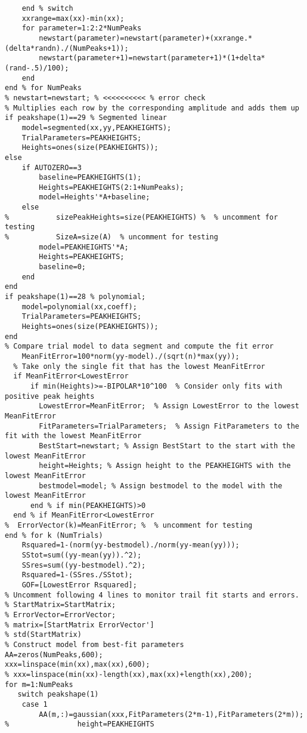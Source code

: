 \begin{lstlisting}
    end % switch
    xxrange=max(xx)-min(xx);
    for parameter=1:2:2*NumPeaks
        newstart(parameter)=newstart(parameter)+(xxrange.*(delta*randn)./(NumPeaks+1));
        newstart(parameter+1)=newstart(parameter+1)*(1+delta*(rand-.5)/100);
    end
end % for NumPeaks
% newstart=newstart; % <<<<<<<<<< % error check
% Multiplies each row by the corresponding amplitude and adds them up
if peakshape(1)==29 % Segmented linear
    model=segmented(xx,yy,PEAKHEIGHTS);
    TrialParameters=PEAKHEIGHTS;
    Heights=ones(size(PEAKHEIGHTS));
else
    if AUTOZERO==3
        baseline=PEAKHEIGHTS(1);
        Heights=PEAKHEIGHTS(2:1+NumPeaks);
        model=Heights'*A+baseline;
    else
%           sizePeakHeights=size(PEAKHEIGHTS) %  % uncomment for testing
%           SizeA=size(A)  % uncomment for testing
        model=PEAKHEIGHTS'*A;
        Heights=PEAKHEIGHTS;
        baseline=0;
    end
end
if peakshape(1)==28 % polynomial;
    model=polynomial(xx,coeff);
    TrialParameters=PEAKHEIGHTS;
    Heights=ones(size(PEAKHEIGHTS));
end
% Compare trial model to data segment and compute the fit error
    MeanFitError=100*norm(yy-model)./(sqrt(n)*max(yy));
  % Take only the single fit that has the lowest MeanFitError
  if MeanFitError<LowestError
      if min(Heights)>=-BIPOLAR*10^100  % Consider only fits with positive peak heights
        LowestError=MeanFitError;  % Assign LowestError to the lowest MeanFitError
        FitParameters=TrialParameters;  % Assign FitParameters to the fit with the lowest MeanFitError
        BestStart=newstart; % Assign BestStart to the start with the lowest MeanFitError
        height=Heights; % Assign height to the PEAKHEIGHTS with the lowest MeanFitError
        bestmodel=model; % Assign bestmodel to the model with the lowest MeanFitError
      end % if min(PEAKHEIGHTS)>0
  end % if MeanFitError<LowestError
%  ErrorVector(k)=MeanFitError; %  % uncomment for testing
end % for k (NumTrials)
    Rsquared=1-(norm(yy-bestmodel)./norm(yy-mean(yy)));
    SStot=sum((yy-mean(yy)).^2);
    SSres=sum((yy-bestmodel).^2);
    Rsquared=1-(SSres./SStot);
    GOF=[LowestError Rsquared];
% Uncomment following 4 lines to monitor trail fit starts and errors.
% StartMatrix=StartMatrix;
% ErrorVector=ErrorVector;
% matrix=[StartMatrix ErrorVector']
% std(StartMatrix)
% Construct model from best-fit parameters
AA=zeros(NumPeaks,600);
xxx=linspace(min(xx),max(xx),600);
% xxx=linspace(min(xx)-length(xx),max(xx)+length(xx),200);
for m=1:NumPeaks
   switch peakshape(1)
    case 1
        AA(m,:)=gaussian(xxx,FitParameters(2*m-1),FitParameters(2*m));
%                height=PEAKHEIGHTS

\end{lstlisting}
